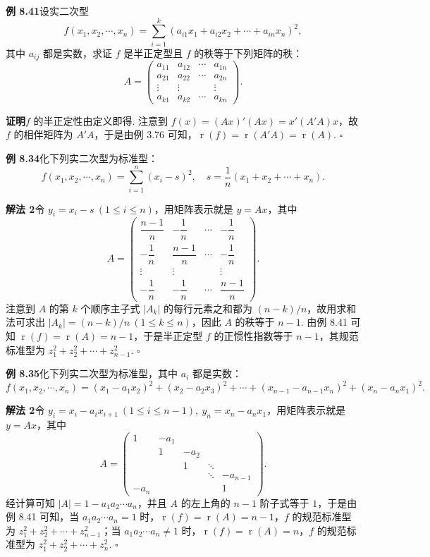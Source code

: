 \documentclass[UTF8, 12pt, fontset=fandol, oneside]{ctexart}
\begin{document}
\noindent\textbf{例 8.41}\quad 设实二次型
\[
f(x_1,x_2,\cdots,x_n)=\sum_{i=1}^k(a_{i1}x_1+a_{i2}x_2+\cdots+a_{in}x_n)^2,
\]
其中 $a_{ij}$ 都是实数，求证 $f$ 是半正定型且 $f$ 的秩等于下列矩阵的秩：
\[
A=\left(\begin{array}{cccc}
a_{11} & a_{12} & \cdots & a_{1n}\\
a_{21} & a_{22} & \cdots & a_{2n}\\
\vdots & \vdots &        & \vdots\\
a_{k1} & a_{k2} & \cdots & a_{kn}
\end{array}\right).
\]

\noindent\textbf{证明}\quad $f$ 的半正定性由定义即得. 注意到 $f(x)=(Ax)'(Ax)=x'(A'A)x$，故 $f$ 的相伴矩阵为 $A'A$，于是由例 3.76 可知，$\operatorname{r}(f)=\operatorname{r}(A'A)=\operatorname{r}(A)$. $\ensuremath{\square}$

\noindent\textbf{例 8.34}\quad 化下列实二次型为标准型：
\[
f(x_1,x_2,\cdots,x_n)=\sum_{i=1}^n(x_i-s)^2,\quad s=\frac1n(x_1+x_2+\cdots+x_n).
\]

\noindent\textbf{解法 2}\quad 令 $y_i=x_i-s\ (1\le i\le n)$，用矩阵表示就是 $y=Ax$，其中
\[
A=\left(\begin{array}{cccc}
\dfrac{n-1}{n} & -\dfrac1n & \cdots & -\dfrac1n\\
-\dfrac1n & \dfrac{n-1}{n} & \cdots & -\dfrac1n\\
\vdots & \vdots & & \vdots\\
-\dfrac1n & -\dfrac1n & \cdots & \dfrac{n-1}{n}
\end{array}\right).
\]
注意到 $A$ 的第 $k$ 个顺序主子式 $|A_k|$ 的每行元素之和都为 $(n-k)/n$，故用求和法可求出 $|A_k|=(n-k)/n\ (1\le k\le n)$，因此 $A$ 的秩等于 $n-1$. 由例 8.41 可知 $\operatorname{r}(f)=\operatorname{r}(A)=n-1$，于是半正定型 $f$ 的正惯性指数等于 $n-1$，其规范标准型为 $z_1^2+z_2^2+\cdots+z_{n-1}^2$. $\ensuremath{\square}$

\noindent\textbf{例 8.35}\quad 化下列实二次型为标准型，其中 $a_i$ 都是实数：
\[
f(x_1,x_2,\cdots,x_n)=(x_1-a_1x_2)^2+(x_2-a_2x_3)^2+\cdots+(x_{n-1}-a_{n-1}x_n)^2+(x_n-a_nx_1)^2.
\]

\noindent\textbf{解法 2}\quad 令 $y_i=x_i-a_ix_{i+1}\ (1\le i\le n-1),\ y_n=x_n-a_nx_1$，用矩阵表示就是 $y=Ax$，其中
\[
A=\left(\begin{array}{ccccc}
1 & -a_1 &        &        &   \\
  & 1    & -a_2   &        &   \\
  &      & 1      & \ddots &   \\
  &      &        & \ddots & -a_{n-1}\\
-a_n &  &        &        & 1
\end{array}\right).
\]
经计算可知 $|A|=1-a_1a_2\cdots a_n$，并且 $A$ 的左上角的 $n-1$ 阶子式等于 $1$，于是由例 8.41 可知，当 $a_1a_2\cdots a_n=1$ 时，$\operatorname{r}(f)=\operatorname{r}(A)=n-1$，$f$ 的规范标准型为 $z_1^2+z_2^2+\cdots+z_{n-1}^2$；当 $a_1a_2\cdots a_n\ne 1$ 时，$\operatorname{r}(f)=\operatorname{r}(A)=n$，$f$ 的规范标准型为 $z_1^2+z_2^2+\cdots+z_n^2$. $\ensuremath{\square}$
\end{document}
